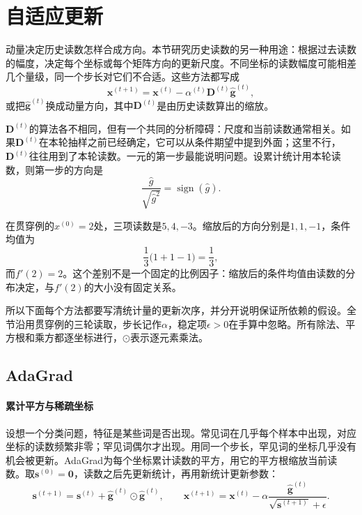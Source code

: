 \section{自适应更新}
\label{sec:sgdb-adaptive}

动量决定历史读数怎样合成方向。本节研究历史读数的另一种用途：根据过去读数的幅度，决定每个坐标或每个矩阵方向的更新尺度。不同坐标的读数幅度可能相差几个量级，同一个步长对它们不合适。这些方法都写成
\begin{equation}
 \bm{x}^{(t+1)}=\bm{x}^{(t)}-\alpha^{(t)}\bm{D}^{(t)}\hat{\bm g}^{(t)},
 \label{eq:sgdb-adaptive-form}
\end{equation}
或把$\hat{\bm g}^{(t)}$换成动量方向，其中$\bm{D}^{(t)}$是由历史读数算出的缩放。

$\bm{D}^{(t)}$的算法各不相同，但有一个共同的分析障碍：尺度和当前读数通常相关。如果$\bm{D}^{(t)}$在本轮抽样之前已经确定，它可以从条件期望中提到外面；这里不行，$\bm{D}^{(t)}$往往用到了本轮读数。一元的第一步最能说明问题。设累计统计用本轮读数，则第一步的方向是
\[
 \frac{\hat g}{\sqrt{\hat g^2}}=\operatorname{sign}(\hat g).
\]

在贯穿例的$x^{(0)}=2$处，三项读数是$5,4,-3$。缩放后的方向分别是$1,1,-1$，条件均值为
\[
 \frac13\bigl(1+1-1\bigr)=\frac13,
\]
而$f'(2)=2$。这个差别不是一个固定的比例因子：缩放后的条件均值由读数的分布决定，与$f'(2)$的大小没有固定关系。

所以下面每个方法都要写清统计量的更新次序，并分开说明保证所依赖的假设。全节沿用贯穿例的三轮读取，步长记作$\alpha$，稳定项$\epsilon>0$在手算中忽略。所有除法、平方根和乘方都逐坐标进行，$\odot$表示逐元素乘法。

\subsection{AdaGrad}
\label{sec:sgdb-adagrad}

\paragraph{累计平方与稀疏坐标}
设想一个分类问题，特征是某些词是否出现。常见词在几乎每个样本中出现，对应坐标的读数频繁非零；罕见词偶尔才出现。用同一个步长，罕见词的坐标几乎没有机会被更新。AdaGrad为每个坐标累计读数的平方，用它的平方根缩放当前读数。取$\bm{s}^{(0)}=\bm{0}$，读数之后先更新统计，再用新统计更新参数：
\begin{equation}
 \bm{s}^{(t+1)}=\bm{s}^{(t)}+\hat{\bm g}^{(t)}\odot\hat{\bm g}^{(t)},\qquad
 \bm{x}^{(t+1)}=\bm{x}^{(t)}-\alpha\frac{\hat{\bm g}^{(t)}}{\sqrt{\bm{s}^{(t+1)}}+\epsilon}.
 \label{eq:sgdb-adagrad}
\end{equation}

